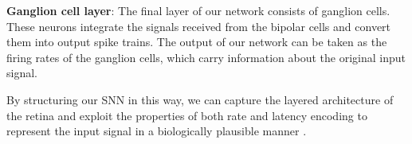 \textbf{Ganglion cell layer}: The final layer of our network consists of ganglion cells. These neurons integrate the signals received from the bipolar cells and convert them into output spike trains. The output of our network can be taken as the firing rates of the ganglion cells, which carry information about the original input signal.

By structuring our SNN in this way, we can capture the layered architecture of the retina and exploit the properties of both rate and latency encoding to represent the input signal in a biologically plausible manner \cite{gollisch2008rapid}.